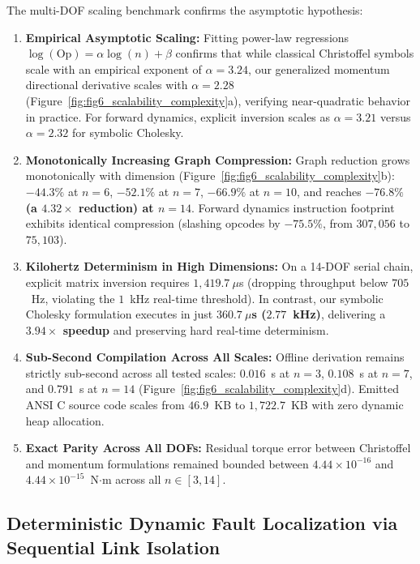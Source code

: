 \documentclass[fleqn,10pt]{article}
\begin{document}
	The multi-DOF scaling benchmark confirms the asymptotic hypothesis:
	\begin{enumerate}
		\item \textbf{Empirical Asymptotic Scaling:} Fitting power-law regressions $\log(\text{Op}) = \alpha \log(n) + \beta$ confirms that while classical Christoffel symbols scale with an empirical exponent of $\alpha = 3.24$, our generalized momentum directional derivative scales with $\alpha = 2.28$ (Figure~\ref{fig:fig6_scalability_complexity}a), verifying near-quadratic behavior in practice. For forward dynamics, explicit inversion scales as $\alpha = 3.21$ versus $\alpha = 2.32$ for symbolic Cholesky.
		\item \textbf{Monotonically Increasing Graph Compression:} Graph reduction grows monotonically with dimension (Figure~\ref{fig:fig6_scalability_complexity}b): $-44.3\%$ at $n=6$, $-52.1\%$ at $n=7$, $-66.9\%$ at $n=10$, and reaches \textbf{$-76.8\%$ (a $4.32\times$ reduction) at $n=14$}. Forward dynamics instruction footprint exhibits identical compression (slashing opcodes by \textbf{$-75.5\%$}, from $307,056$ to $75,103$).
		\item \textbf{Kilohertz Determinism in High Dimensions:} On a 14-DOF serial chain, explicit matrix inversion requires $1,419.7~\mu$s (dropping throughput below $705$~Hz, violating the $1$~kHz real-time threshold). In contrast, our symbolic Cholesky formulation executes in just \textbf{$360.7~\mu$s ($2.77$~kHz)}, delivering a \textbf{$3.94\times$ speedup} and preserving hard real-time determinism.
		\item \textbf{Sub-Second Compilation Across All Scales:} Offline derivation remains strictly sub-second across all tested scales: $0.016$~s at $n=3$, $0.108$~s at $n=7$, and $0.791$~s at $n=14$ (Figure~\ref{fig:fig6_scalability_complexity}d). Emitted ANSI C source code scales from $46.9$~KB to $1,722.7$~KB with zero dynamic heap allocation.
		\item \textbf{Exact Parity Across All DOFs:} Residual torque error between Christoffel and momentum formulations remained bounded between $4.44 \times 10^{-16}$ and $4.44 \times 10^{-15}$~N$\cdot$m across all $n \in [3, 14]$.
	\end{enumerate}
	
	\subsection*{Deterministic Dynamic Fault Localization via Sequential Link Isolation}
	
\end{document}
